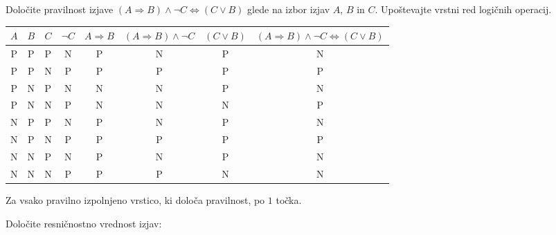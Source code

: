\documentclass[addpoints,12pt]{exam}
\begin{document}
\begin{questions}

    
    \question[8]
    Določite pravilnost izjave $(A\Rightarrow  B)\land \lnot C \Leftrightarrow (C\lor B)$ glede na izbor izjav $A$, $B$ in $C$. Upoštevajte vrstni red logičnih operacij.

    \begin{solution}[8cm]
        \begin{table}[H]
            \begin{tabular}{cccccccc}
             $A$ & $B$ & $C$ & $\lnot C$ & $A\Rightarrow B$ & $(A\Rightarrow B)\land\lnot C$ & $(C\lor B)$ & $(A\Rightarrow  B)\land \lnot C \Leftrightarrow (C\lor B)$\\ \hline
             P & P & P & N & P & N & P & N \\ 
             P & P & N & P & P & P & P & P \\
             P & N & P & N & N & N & P & N \\
             P & N & N & P & N & N & N & P \\
             N & P & P & N & P & N & P & N \\ 
             N & P & N & P & P & P & P & P \\
             N & N & P & N & P & N & P & N \\
             N & N & N & P & P & P & N & N
            \end{tabular}
        \end{table}
        Za vsako pravilno izpolnjeno vrstico, ki določa pravilnost, po $1$ točka.
    \end{solution}


\newpage

    \question[3]
    Določite resničnostno vrednost izjav:


\end{questions}
\end{document}
